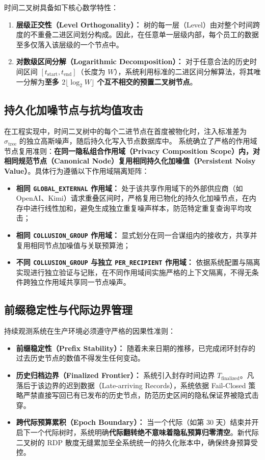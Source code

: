 时间二叉树具备如下核心数学特性：
\begin{enumerate}[label=(\alph*), leftmargin=2.5em]
  \item \textbf{层级正交性（Level Orthogonality）：} 树的每一层（Level）由对整个时间跨度的不重叠二进区间划分构成。因此，在任意单一层级内部，每个员工的数据至多仅落入该层级的一个节点中。
  \item \textbf{对数级区间分解（Logarithmic Decomposition）：} 对于任意合法的历史时间区间 $[t_{\text{start}}, t_{\text{end}}]$（长度为 $W$），系统利用标准的二进区间分解算法，将其唯一分解为\textbf{至多 $2 \lfloor \log_2 W \rfloor$ 个互不相交的预置二叉树节点}。
\end{enumerate}

\subsection{持久化加噪节点与抗均值攻击}
在工程实现中，时间二叉树中的每个二进节点在首度被物化时，注入标准差为 $\sigma_{\text{tree}}$ 的独立高斯噪声，随后持久化写入节点数据库中。
系统确立了严格的作用域节点复用准则：\textbf{在同一隐私组合作用域（Privacy Composition Scope）内，对相同规范节点（Canonical Node）复用相同持久化加噪值（Persistent Noisy Value）}。具体行为遵循以下作用域隔离矩阵：
\begin{itemize}[leftmargin=2em]
  \item \textbf{相同 \texttt{GLOBAL\_EXTERNAL} 作用域：} 处于该共享作用域下的外部供应商（如 OpenAI、Kimi）请求重叠区间时，严格复用已物化的持久化加噪节点，在内存中进行线性加和，避免生成独立重复噪声样本，防范特定重复查询平均攻击；
  \item \textbf{相同 \texttt{COLLUSION\_GROUP} 作用域：} 显式划分在同一合谋组内的接收方，共享并复用相同节点加噪值与关联预算池；
  \item \textbf{不同 \texttt{COLLUSION\_GROUP} 与独立 \texttt{PER\_RECIPIENT} 作用域：} 依据系统配置与隔离实现进行独立验证与记账，在不同作用域间实施严格的上下文隔离，不得无条件跨独立作用域共享同一节点噪声。
\end{itemize}

\subsection{前缀稳定性与代际边界管理}
持续观测系统在生产环境必须遵守严格的因果性准则：
\begin{itemize}[leftmargin=2em]
  \item \textbf{前缀稳定性（Prefix Stability）：} 随着未来日期的推移，已完成闭环封存的过去历史节点的数值不得发生任何变动。
  \item \textbf{历史归档边界（Finalized Frontier）：} 系统引入封存时间边界 $T_{\text{finalized}}$。凡落后于该边界的迟到数据（Late-arriving Records），系统依据 Fail-Closed 策略严禁直接写回已有已发布的历史节点，防范历史区间的隐私保证界被隐式击穿。
  \item \textbf{跨代际预算累积（Epoch Boundary）：} 当一个代际（如第 30 天）结束并开启下一个代际树时，系统明确\textbf{代际翻转绝不意味着隐私预算归零清空}。新代际二叉树的 RDP 散度无缝累加至全系统统一的持久化账本中，确保终身预算受控。
\end{itemize}
